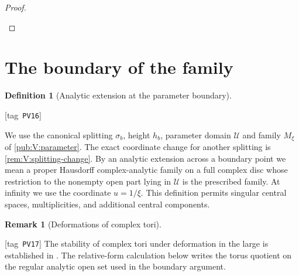 \documentclass[11pt,a4paper]{article}
\numberwithin{equation}{section}
\theoremstyle{definition}
\newtheorem{definition}[definition]{Definition}
\newtheorem{remark}[remark]{Remark}
\newcommand{\StatementRecord}[4]{{\upshape\footnotesize[tag~\texttt{#3}]}\enspace\ignorespaces}
\begin{document}
\begin{proof}
\begin{enumerate}[label=\arabic*.]
\end{enumerate}
\end{proof}


\section{The boundary of the family}\label{pub:V:sec-boundary}

\begin{definition}[Analytic extension at the parameter boundary]\hypertarget{tag-PV16}{}\label{def:V:analytic-boundary-extension}
\StatementRecord{def:V:analytic-boundary-extension}{proved}{PV16}{}

We use the canonical splitting $\sigma_b$, height $h_b$, parameter
domain $\mathcal U$ and family $M_\xi$ of \cref{pub:V:parameter}.
The exact coordinate change for another splitting is
\cref{rem:V:splitting-change}.
By an analytic extension across a boundary point we mean a proper
Hausdorff complex-analytic family on a full complex disc whose
restriction to the nonempty open part lying in $\mathcal U$ is
the prescribed family. At infinity we use the coordinate $u=1/\xi$.
This definition permits singular central spaces, multiplicities,
and additional central components.
\end{definition}

\begin{remark}[Deformations of complex tori]\hypertarget{tag-PV17}{}\label{rem:V:tori-deformations-input}
\StatementRecord{rem:V:tori-deformations-input}{proved}{PV17}{}
The stability of complex tori under deformation in the large is
established in \cite[definition, p.~261; Theorem 2.1, p.~264]{Catanese2004}.
The relative-form calculation below writes the torus quotient
on the regular analytic open set used in the boundary argument.
\end{remark}
\end{document}
